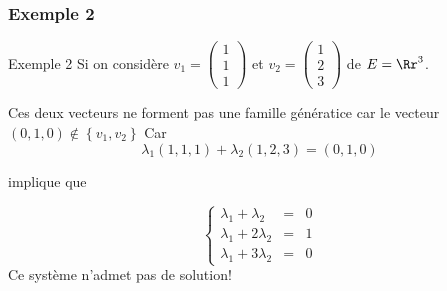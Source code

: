 \documentclass[dvipsnames]{beamer}
\begin{document}
\begin{frame}[t]
  \frametitle{Exemple 2}
  \begin{block}{Exemple 2}
    \small
    Si on considère  $v_1 = \begin{pmatrix}
     1 \\ 1 \\ 1 
    \end{pmatrix}$ et $v_2 = \begin{pmatrix}
     1 \\ 2 \\ 3 
    \end{pmatrix}$ de $E=\Rr^3$.
   
    Ces deux vecteurs ne forment pas une famille génératice car le vecteur
    $(0,1,0)\notin \left\{v_1, v_2\right\}$  Car 
    \begin{equation}
      \lambda_1 (1,1,1) + \lambda_2 (1, 2, 3) = (0, 1, 0)
    \end{equation}
    
    implique que

    \begin{equation*}
      \left\{
        \begin{array}{lll}
          \lambda_1 + \lambda_2 & =& 0\\[4pt]
          \lambda_1 + 2\lambda_2 & = & 1\\[4pt]
          \lambda_1 + 3\lambda_2 & = & 0
      \end{array}\right.
    \end{equation*}
    Ce système n'admet pas de solution!
  \end{block}
  
\end{frame}
\end{document}
